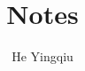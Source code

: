 \documentclass[a4paper,12pt]{book}
\begin{document}
\author{He Yingqiu}
\title{Notes}


\frontmatter
\maketitle
\tableofcontents

\mainmatter










\backmatter
\end{document}
